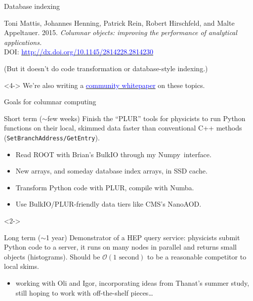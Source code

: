 \documentclass{beamer}
\begin{document}
\begin{frame}{Database indexing}
\begin{uncoverenv}
\begin{minipage}{\linewidth}
\scriptsize
Toni Mattis, Johannes Henning, Patrick Rein, Robert Hirschfeld, and Malte Appeltauer. 2015. {\it Columnar objects: improving the performance of analytical applications.} \\ DOI: \href{http://dx.doi.org/10.1145/2814228.2814230}{\textcolor{blue}{http://dx.doi.org/10.1145/2814228.2814230}}
\end{minipage}

\vspace{0.1 cm}
(But it doesn't do code transformation or database-style indexing.)
\end{uncoverenv}

\vspace{0.2 cm}
\begin{uncoverenv}<4->
We're also writing a \href{https://docs.google.com/document/d/1-ZrnsS3IZdH91_pb99OLGd4gxaMm3m3Vr7XBigpx8DE/edit?usp=sharing}{\textcolor{blue}{community whitepaper}} on these topics.
\end{uncoverenv}
\end{frame}

\begin{frame}{Goals for columnar computing}
\vspace{0.2 cm}
\begin{block}{Short term ($\sim$few weeks)}
Finish the ``PLUR'' tools for physicists to run Python functions on their local, skimmed data faster than conventional C++ methods ({\tt\small SetBranchAddress/GetEntry}).
\begin{itemize}
\item Read ROOT with Brian's BulkIO through my \mbox{Numpy interface.\hspace{-1 cm}}
\item New arrays, and someday database index arrays, in SSD cache.
\item Transform Python code with PLUR, compile with Numba.
\item Use BulkIO/PLUR-friendly data tiers like CMS's NanoAOD.
\end{itemize}
\end{block}

\vspace{-0.2 cm}
\begin{uncoverenv}<2->
\begin{block}{Long term ($\sim$1 year)}
Demonstrator of a HEP query service: physicists submit Python code to a server, it runs on many nodes in parallel and returns small objects (histograms). Should be $\mathcal{O}({\mbox{1 second}})$ to be a reasonable competitor to local skims.
\begin{itemize}
\item working with Oli and Igor, incorporating ideas from Thanat's summer study, still hoping to work with off-the-shelf pieces\ldots
\end{itemize}
\end{block}
\end{uncoverenv}
\end{frame}
\end{document}
